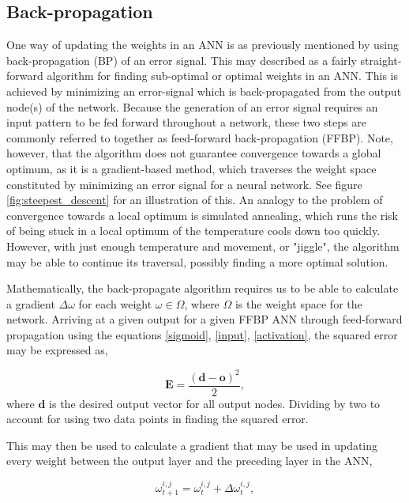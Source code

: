 \subsection*{Back-propagation}\label{BP}

One way of updating the weights in an ANN is as previously mentioned by using back-propagation (BP) of an error signal. This may described as a fairly straight-forward algorithm for finding sub-optimal or optimal weights in an ANN. This is achieved by minimizing an error-signal which is back-propagated from the output node(s) of the network. Because the generation of an error signal requires an input pattern to be fed forward throughout a network, these two steps are commonly referred to together as feed-forward back-propagation (FFBP). Note, however, that the algorithm does not guarantee convergence towards a global optimum, as it is a gradient-based method, which traverses the weight space constituted by minimizing an error signal for a neural network. See figure \ref{fig:steepest_descent} for an illustration of this. An analogy to the problem of convergence towards a local optimum is simulated annealing, which runs the risk of being stuck in a local optimum of the temperature cools down too quickly. However, with just enough temperature and movement, or "jiggle", the algorithm may be able to continue its traversal, possibly finding a more optimal solution.

Mathematically, the back-propagate algorithm requires us to be able to calculate a gradient $\Delta \omega$ for each weight $\omega \in \Omega$, where $\Omega$ is the weight space for the network. Arriving at a given output for a given FFBP ANN through feed-forward propagation using the equations \eqref{sigmoid}, \eqref{input}, \eqref{activation}, the squared error may be expressed as,

\begin{equation}
    \textbf{E} = \frac{(\textbf{d} - \textbf{o})^2}{2},
\end{equation}
where $\textbf{d}$ is the desired output vector for all output nodes. Dividing by two to account for using two data points in finding the squared error.

This may then be used to calculate a gradient that may be used in updating every weight between the output layer and the preceding layer in the ANN,

\begin{equation}\label{weight_update}
    \omega_{t+1}^{i,j} = \omega_{t}^{i,j} + \Delta \omega_{t}^{i,j},
\end{equation}

